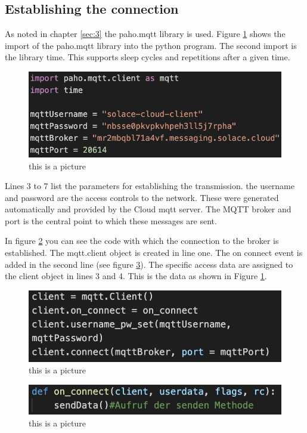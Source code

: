 \subsection{Establishing the connection}
As noted in chapter \ref{sec:3} the paho.mqtt library is used. Figure \ref{imports} shows the import of the paho.mqtt library into the python program.
The second import is the library time. This supports sleep cycles and repetitions after a given time.
\begin{figure}
\sidecaption
\includegraphics[scale=1]{chapters/chapter1_dominic/Imports.png}
\caption{this is a picture}
\label{imports}
\end{figure}
Lines 3 to 7 list the parameters for establishing the transmission. the username and password are the access controls to the network. These were generated automatically and provided by the Cloud mqtt server. The MQTT broker and port is the central point to which these messages are sent.

In figure \ref{connection} you can see the code with which the connection to the broker is established.
The mqtt.client object is created in line one. The on connect event is added in the second line (see figure \ref{onConnect}). The specific access data are assigned to the client object in lines 3 and 4. This is the data as shown in Figure \ref{imports}.
\begin{figure}
\sidecaption
\includegraphics[scale=1]{chapters/chapter1_dominic/establishConnection.png}
\caption{this is a picture}
\label{connection}
\end{figure}
\begin{figure}
\sidecaption
\includegraphics[scale=1]{chapters/chapter1_dominic/onConnect.png}
\caption{this is a picture}
\label{onConnect}
\end{figure}

